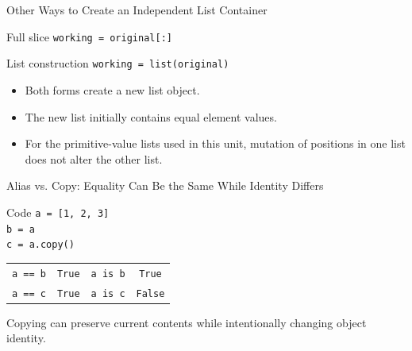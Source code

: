 \documentclass[aspectratio=169,10pt]{beamer}
\begin{document}
\begin{frame}{Other Ways to Create an Independent List Container}
  \begin{block}{Full slice}
    \texttt{working = original[:]}
  \end{block}

  \begin{block}{List construction}
    \texttt{working = list(original)}
  \end{block}

  \begin{itemize}
    \item Both forms create a new list object.
    \item The new list initially contains equal element values.
    \item For the primitive-value lists used in this unit, mutation of positions in one list does not alter the other list.
  \end{itemize}
\end{frame}

\begin{frame}{Alias vs. Copy: Equality Can Be the Same While Identity Differs}
  \begin{block}{Code}
    \texttt{a = [1, 2, 3]}\\
    \texttt{b = a}\\
    \texttt{c = a.copy()}
  \end{block}

  \begin{center}
    \renewcommand{\arraystretch}{1.2}
    \begin{tabular}{l|c@{\qquad}l|c}
      \texttt{a == b} & \texttt{True} & \texttt{a is b} & \texttt{True} \\
      \texttt{a == c} & \texttt{True} & \texttt{a is c} & \texttt{False}
    \end{tabular}
  \end{center}

  \begin{keyidea}
    Copying can preserve current contents while intentionally changing object identity.
  \end{keyidea}
\end{frame}
\end{document}
